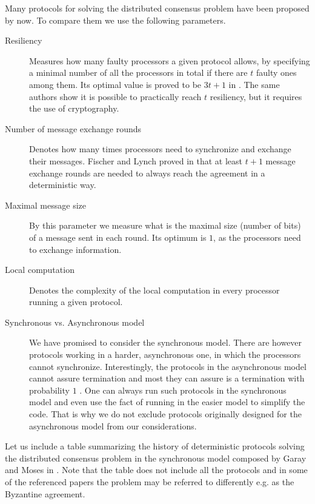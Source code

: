 Many protocols for solving the distributed consensus problem have been proposed by now. To compare them we use the following parameters. 

\begin{description}
    \item[Resiliency]
     Measures how many faulty processors a given protocol allows, by specifying a minimal number of all the processors in total if there are $t$ faulty ones among them. Its optimal value is proved to be $3t+1$ in \cite{BGP89}. The same authors show it is possible to practically reach $t$ resiliency, but it requires the use of cryptography.
    \item[Number of message exchange rounds] Denotes how many times processors need to synchronize and exchange their messages. Fischer and Lynch proved in \cite{FL82} that at least $t+1$ message exchange rounds are needed to always reach the agreement in a deterministic way.
    \item[Maximal message size] By this parameter we measure what is the maximal size (number of bits) of a message sent in each round. Its optimum is $1$, as the processors need to exchange information.
    \item[Local computation] Denotes the complexity of the local computation in every processor running a given protocol.
    \item[Synchronous vs. Asynchronous model] We have promised to consider the synchronous model. There are however protocols working in a harder, asynchronous one, in which the processors cannot synchronize. Interestingly, the protocols in the asynchronous model cannot assure termination and most they can assure is a termination with probability $1$ \cite{FLP85}. One can always run such protocols in the synchronous model and even use the fact of running in the easier model to simplify the code. That is why we do not exclude protocols originally designed for the asynchronous model from our considerations.
\end{description}

Let us include a table summarizing the history of deterministic protocols solving the distributed consensus problem in the synchronous model composed by Garay and Moses in \cite{GM98}. Note that the table does not include all the protocols and in some of the referenced papers the problem may be referred to differently e.g. as the Byzantine agreement.

